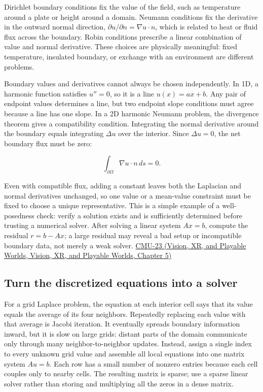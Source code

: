 Dirichlet boundary conditions fix the value of the field, such as temperature around a plate or height around a domain. Neumann conditions fix the derivative in the outward normal direction, \(\partial u/\partial n=\nabla u\cdot n\), which is related to heat or fluid flux across the boundary. Robin conditions prescribe a linear combination of value and normal derivative. These choices are physically meaningful: fixed temperature, insulated boundary, or exchange with an environment are different problems.

Boundary values and derivatives cannot always be chosen independently. In 1D, a harmonic function satisfies \(u''=0\), so it is a line \(u(x)=ax+b\). Any pair of endpoint values determines a line, but two endpoint slope conditions must agree because a line has one slope. In a 2D harmonic Neumann problem, the divergence theorem gives a compatibility condition. Integrating the normal derivative around the boundary equals integrating \(\Delta u\) over the interior. Since \(\Delta u=0\), the net boundary flux must be zero:

\[
\int_{\partial\Omega}\nabla u\cdot n\,ds=0.
\]

Even with compatible flux, adding a constant leaves both the Laplacian and normal derivatives unchanged, so one value or a mean-value constraint must be fixed to choose a unique representative. This is a simple example of a well-posedness check: verify a solution exists and is sufficiently determined before trusting a numerical solver. After solving a linear system \(Ax=b\), compute the residual \(r=b-Ax\); a large residual may reveal a bad setup or incompatible boundary data, not merely a weak solver. \href{../07-Vision-XR-and-Playable-Worlds/main.pdf\#nameddest=04-visual-computing-ii-ch036-cmu-23---physically-based-animation-and-pdes}{CMU-23 (Vision, XR, and Playable Worlds, Vision, XR, and Playable Worlds, Chapter 5)}

\subsection{Turn the discretized equations into a solver}\label{04-visual-computing-ii-ch030-turn-the-discretized-equations-into-a-solver}

For a grid Laplace problem, the equation at each interior cell says that its value equals the average of its four neighbors. Repeatedly replacing each value with that average is Jacobi iteration. It eventually spreads boundary information inward, but it is slow on large grids: distant parts of the domain communicate only through many neighbor-to-neighbor updates. Instead, assign a single index to every unknown grid value and assemble all local equations into one matrix system \(Au=b\). Each row has a small number of nonzero entries because each cell couples only to nearby cells. The resulting matrix is sparse; use a sparse linear solver rather than storing and multiplying all the zeros in a dense matrix.

